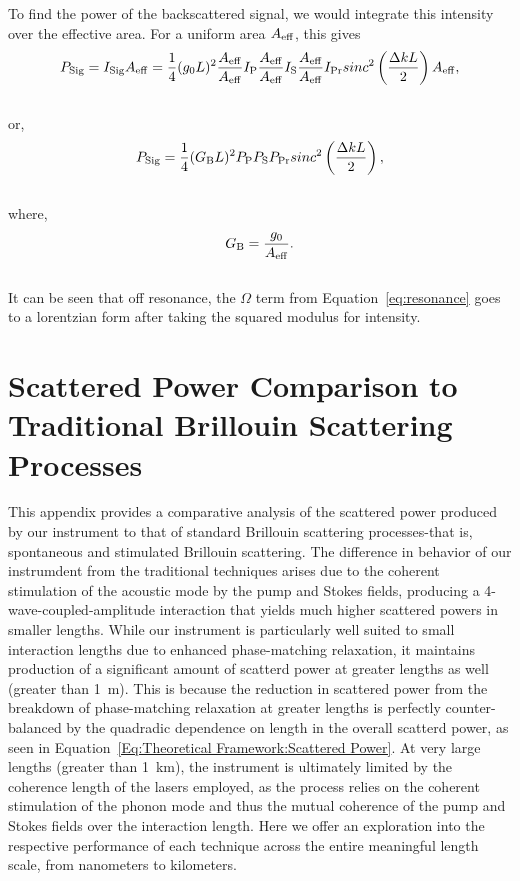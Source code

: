 To find the power of the backscattered signal, we would integrate this intensity over the effective area. For a uniform area \(A_{\rm eff}\), this gives
\\
\begin{equation}
  P_{\rm Sig} = I_{\rm Sig}A_{\rm eff} = \frac{1}{4}(g_{0}L)^{2}\frac{A_{\rm eff}}{A_{\rm eff}}I_{\rm P}\frac{A_{\rm eff}}{A_{\rm eff}}I_{\rm S}\frac{A_{\rm eff}}{A_{\rm eff}}I_{\rm Pr}sinc^{2}\left(\frac{\Delta kL}{2}\right)A_{\rm eff},
\end{equation}
\\
or,
\\
\begin{equation}
  P_{\rm Sig} = \frac{1}{4}(G_{\rm B}L)^{2}P_{\rm P}P_{\rm S}P_{\rm Pr}sinc^{2}\left(\frac{\Delta kL}{2}\right),
\end{equation}
\\
where,
\\
\begin{equation}
  G_{\rm B} = \frac{g_{0}}{A_{\rm eff}}.
\end{equation}
\\
It can be seen that off resonance, the \(\Omega\) term from Equation~\ref{eq:resonance} goes to a lorentzian form after taking the squared modulus for intensity.

\newpage


\section{Scattered Power Comparison to Traditional Brillouin Scattering Processes}
\label{appendix:comparison}

This appendix provides a comparative analysis of the scattered power produced by our instrument to that of standard Brillouin scattering processes-that is, spontaneous and stimulated Brillouin scattering. The difference in behavior of our instrumdent from the traditional techniques arises due to the coherent stimulation of the acoustic mode by the pump and Stokes fields, producing a 4-wave-coupled-amplitude interaction that yields much higher scattered powers in smaller lengths. While our instrument is particularly well suited to small interaction lengths due to enhanced phase-matching relaxation, it maintains production of a significant amount of scatterd power at greater lengths as well (greater than \SI{1}{\meter}). This is because the reduction in scattered power from the breakdown of phase-matching relaxation at greater lengths is perfectly counter-balanced by the quadradic dependence on length in the overall scatterd power, as seen in Equation~\ref{Eq:Theoretical Framework:Scattered Power}. At very large lengths (greater than \SI{1}{\kilo\meter}), the instrument is ultimately limited by the coherence length of the lasers employed, as the process relies on the coherent stimulation of the phonon mode and thus the mutual coherence of the pump and Stokes fields over the interaction length. Here we offer an exploration into the respective performance of each technique across the entire meaningful length scale, from nanometers to kilometers.

